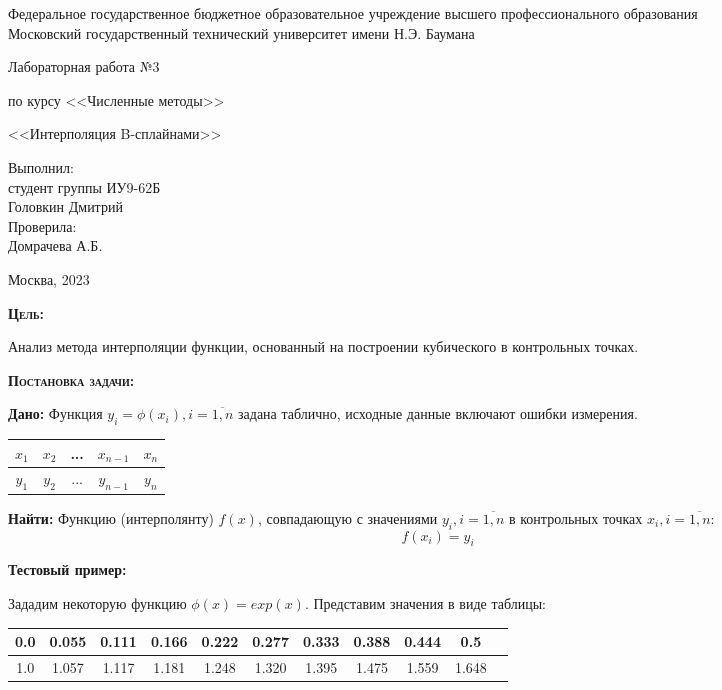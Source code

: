 \documentclass [12pt]{article}
\title{}
\date{}
\author{}
\begin{document}
\begin{titlepage}
\thispagestyle{empty}
\begin{center}
Федеральное государственное бюджетное образовательное учреждение высшего профессионального образования \\Московский государственный технический университет имени Н.Э. Баумана

\end{center}
\vfill
\centerline{\large{Лабораторная работа №3}}
\centerline{\large{по курсу <<Численные методы>>}}
\centerline{\large{<<Интерполяция B-сплайнами>>}}
\vfill
\hfill\parbox{5cm} {
           Выполнил:\\
           студент группы ИУ9-62Б \hfill \\
           Головкин Дмитрий\hfill \medskip\\
           Проверила:\\
           Домрачева А.Б.\hfill
       }
\centerline{Москва, 2023}
\clearpage
\end{titlepage}

\textsc{\textbf{Цель:}} 

Анализ метода интерполяции функции, основанный на построении кубического в контрольных точках.

\textsc{\textbf{Постановка задачи:}} 

\textbf{Дано:}  Функция $y_i = \phi(x_i),  i = \overline{1,n}$ задана таблично, исходные данные включают ошибки измерения.

\begin{table}[h]
\begin{center}
\begin{tabular}{|c|c|c|c|c|}
\hline
$x_1$ & $x_2$ & ... & $x_{n-1}$ & $x_n$ \\
\hline
$y_1$ & $y_2$ & ... & $y_{n-1}$ & $y_n$ \\
\hline
\end{tabular}
\end{center}
\end{table}

\textbf{Найти:} Функцию (интерполянту) $f(x)$, совпадающую с значениями $y_i, i = \overline{1,n}$ в контрольных точках $x_i, i = \overline{1,n}$:
$$f(x_i)=y_i$$

\textbf{Тестовый пример:} 

Зададим некоторую функцию $\phi(x) = exp(x)$. Представим значения в виде таблицы:

\begin{table}[h]
\begin{center}
\begin{tabular}{|c|c|c|c|c|c|c|c|c|c|c|}
\hline
0.0 & 0.055 & 0.111 & 0.166 & 0.222 & 0.277 & 0.333 & 0.388 & 0.444 & 0.5\\
\hline
1.0 & 1.057 & 1.117 & 1.181 & 1.248 & 1.320 & 1.395 & 1.475 & 1.559 & 1.648\\
\hline
\end{tabular}
\end{center}
\end{table}
\end{document}
